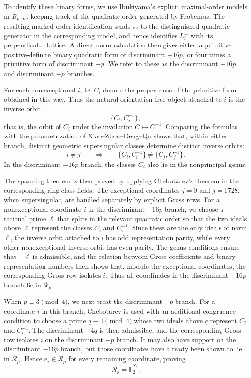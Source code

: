 \documentclass[11pt]{amsart}
\theoremstyle{definition}
\theoremstyle{remark}
\newcommand{\F}{\mathbb{F}}
\begin{document}
To identify these binary forms, we use Ibukiyama's explicit maximal-order
models in $B_{p,\infty}$, keeping track of the quadratic order generated by
Frobenius. The resulting marked-order identification sends $\pi_i$ to the
distinguished quadratic generator in the corresponding model, and hence
identifies $L_i^\perp$ with its perpendicular lattice. A direct norm
calculation then gives either a primitive positive-definite binary quadratic
form of discriminant $-16p$, or four times a primitive form of discriminant
$-p$. We refer to these as the discriminant $-16p$ and discriminant $-p$
branches.

For each nonexceptional $i$, let $C_i$ denote the proper class of the
primitive form obtained in this way. Thus the natural orientation-free
object attached to $i$ is the inverse orbit
\[
  \{C_i,C_i^{-1}\},
\]
that is, the orbit of $C_i$ under the involution $C\mapsto C^{-1}$.
Comparing the formulas with the parametrization of Xiao--Zhou--Deng--Qu
\cite[Theorems~3.3, 3.5 and~3.7]{XZDQ2025} shows that, within either
branch, distinct geometric supersingular classes determine distinct
inverse orbits:
\[
  i\ne j
  \qquad\Longrightarrow\qquad
  \{C_i,C_i^{-1}\}\ne\{C_j,C_j^{-1}\}.
\]
In the discriminant $-16p$ branch, the classes $C_i$ also
lie in the nonprincipal genus.

The spanning theorem is then proved by applying Chebotarev's theorem in
the corresponding ring class fields. The exceptional coordinates $j=0$
and $j=1728$, when supersingular, are handled separately by explicit Gross
rows. For a nonexceptional coordinate $i$ in the discriminant $-16p$
branch, we choose a rational prime $\ell$ that splits in the relevant
quadratic order so that the two ideals above $\ell$ represent the classes
$C_i$ and $C_i^{-1}$. Since these are the only ideals of norm $\ell$, the
inverse orbit attached to $i$ has odd representation parity, while every
other nonexceptional inverse orbit has even parity. The genus conditions
ensure that $-\ell$ is admissible, and the relation between Gross
coefficients and binary representation numbers then shows that, modulo the
exceptional coordinates, the corresponding Gross row isolates $i$. Thus
all coordinates in the discriminant $-16p$ branch lie in $\mathcal R_p$.

When $p\equiv3\pmod4$, we next treat the discriminant $-p$ branch. For a
coordinate $i$ in this branch, Chebotarev is used with an additional
congruence condition to choose a prime $q\equiv1\pmod4$ whose two ideals
above $q$ represent $C_i$ and $C_i^{-1}$. The discriminant $-4q$ is then
admissible, and the corresponding Gross row isolates $i$ on the
discriminant $-p$ branch. It may also have support on the
discriminant $-16p$ branch, but those coordinates have already been shown
to lie in $\mathcal R_p$. Hence $e_i\in\mathcal R_p$ for every remaining
coordinate, proving
\[
  \mathcal R_p=\F_2^{S_p}.
\]
\end{document}
